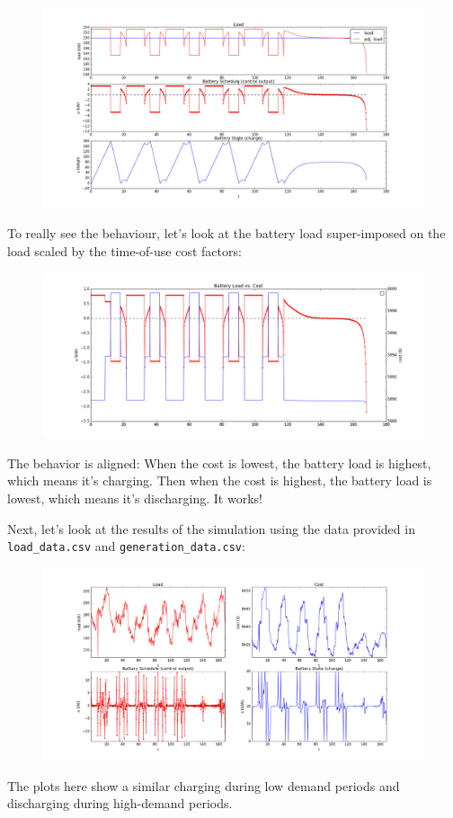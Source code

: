 \documentclass[12pt]{article}
\begin{document}
\begin{figure}[h]
\includegraphics[width=\textwidth]{basicsummary}
\end{figure}
To really see the behaviour, let's look at the battery load super-imposed on the load scaled by the time-of-use cost factors:
\begin{figure}[h]
\includegraphics[width=\textwidth]{loadVcost}
\end{figure}
The behavior is aligned: When the cost is lowest, the battery load is highest, which means it's charging. Then when the cost is highest, the battery load is lowest, which means it's discharging. It works! 

Next, let's look at the results of the simulation using the data provided in \texttt{load\_data.csv} and \texttt{generation\_data.csv}:
\begin{figure}[h]
\includegraphics[width=\textwidth]{realsummary}
\end{figure}
 \newline The plots here show a similar charging during low demand periods and discharging during high-demand periods. 
\end{document}
